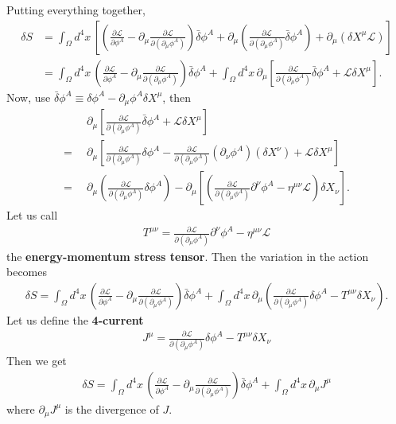 \documentclass{book}
\numberwithin{equation}{section}
\theoremstyle{definition}
\newcommand{\p}{\partial}
\newcommand{\lag}{\mathcal{L}}
\newcommand{\nn}{\nonumber}
\begin{document}
Putting everything together,
\begin{align}
\delta S &= \int_\Omega d^4x\,\left[\left(\frac{\p \lag}{\p \phi^A} - \p_\mu \frac{\p \lag}{\p( \p_\mu\phi^A)}\right)\bar{\delta}\phi^A + \p_\mu \left(\frac{\p \lag}{\p(\p_\mu\phi^A)}\bar{\delta}\phi^A\right) +  \p_\mu \left(\delta X^\mu \lag\right)\right]\nn\\
&= \int_\Omega d^4x\, \left(\frac{\p \lag}{\p \phi^A} - \p_\mu \frac{\p \lag}{\p( \p_\mu\phi^A)}\right)\bar{\delta}\phi^A + \int_\Omega d^4x\, \p_\mu\left[\frac{\p \lag}{\p( \p_\mu \phi^A)} \bar{\delta}\phi^A + \lag \delta X^\mu\right].
\end{align}
Now, use $\bar{\delta}\phi^A \equiv \delta \phi^A - \p_\mu \phi^A \delta X^\mu$, then
\begin{align}
&\p_\mu\left[\frac{\p \lag}{\p( \p_\mu \phi^A)} \bar{\delta}\phi^A + \lag \delta X^\mu\right]\nn\\
=\,\,\, & \p_\mu \left[ \frac{\p \lag}{\p( \p_\mu\phi^A)}\delta \phi^A - \frac{\p \lag}{\p( \p_\mu \phi^A)}(\p_\nu \phi^A)( \delta X^\nu) + \lag \delta X^\mu\right]\nn\\
=\,\,\, & \p_\mu \left(\frac{\p \lag}{\p( \p_\mu\phi^A)}\delta \phi^A \right) - \p_\mu\left[\left(\frac{\p \lag}{\p( \p_\mu \phi^A)}\p^\nu\phi^A - \eta^{\mu\nu}\lag\right)\delta X_\nu\right].
\end{align}
Let us call
\begin{align}
\boxed{T^{\mu\nu} = \frac{\p \lag}{\p( \p_\mu\phi^A)}\p^\nu\phi^A - \eta^{\mu\nu}\lag}
\end{align}
the \textbf{energy-momentum stress tensor}. Then the variation in the action becomes
\begin{align}
\delta S = \int_\Omega d^4x\,\left(\frac{\p \lag}{\p \phi^A} - \p_\mu\frac{\p \lag}{\p( \p_\mu\phi^A)}\right)\bar{\delta}\phi^A + \int_\Omega d^4x\, \p_\mu\left(\frac{\p \lag}{\p( \p_\mu\phi^A)}\delta \phi^A - T^{\mu\nu}\delta X_\nu\right).
\end{align}
Let us define the \textbf{4-current}
\begin{align}
\boxed{J^\mu = \frac{\p \lag}{\p( \p_\mu\phi^A)}\delta \phi^A - T^{\mu\nu}\delta X_\nu}
\end{align}
Then we get
\begin{align}
\boxed{\delta S = \int_\Omega d^4x\,\left(\frac{\p \lag}{\p \phi^A} - \p_\mu\frac{\p \lag}{\p( \p_\mu\phi^A)}\right)\bar{\delta}\phi^A
+ \int_\Omega d^4x\,\p_\mu J^\mu}
\end{align}
where $\p_\mu J^\mu$ is the divergence of $J$. \\
\end{document}

